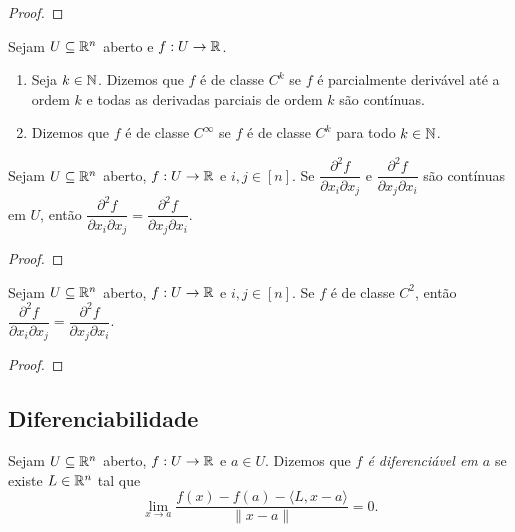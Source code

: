 \begin{proof}
    \blackproof
\end{proof}

\begin{definition}
    Sejam $U \subseteq \mathbb{R}^n$ aberto e $f : U \to \mathbb{R}$.
        \begin{enumerate}[leftmargin=*, align=left, label=\textbf{(\alph*)}]
            \item Seja $k \in \mathbb{N}$. Dizemos que $f$ é de classe $C^k$ se $f$ é parcialmente derivável até a ordem $k$ e todas as derivadas parciais de ordem $k$ são contínuas.
            \item Dizemos que $f$ é de classe $C^{\infty}$ se $f$ é de classe $C^k$ para todo $k \in \mathbb{N}$.
        \end{enumerate}
\end{definition}

\begin{theorem}
    Sejam $U \subseteq \mathbb{R}^n$ aberto, $f : U \to \mathbb{R}$ e $i,j \in [n]$. Se $\dfrac{\partial^2 f}{\partial x_i \partial x_j}$ e $\dfrac{\partial^2 f}{\partial x_j \partial x_i}$ são contínuas em $U$, então $\dfrac{\partial^2 f}{\partial x_i \partial x_j} = \dfrac{\partial^2 f}{\partial x_j \partial x_i}$.
\end{theorem}

\begin{proof}
    \blackproof
\end{proof}

\begin{corollary}
    Sejam $U \subseteq \mathbb{R}^n$ aberto, $f : U \to \mathbb{R}$ e $i,j \in [n]$. Se $f$ é de classe $C^2$, então $\dfrac{\partial^2 f}{\partial x_i \partial x_j} = \dfrac{\partial^2 f}{\partial x_j \partial x_i}$.
\end{corollary}

\begin{proof}
    \blackproof
\end{proof}

\subsection{Diferenciabilidade}

\begin{definition}
    Sejam $U \subseteq \mathbb{R}^n$ aberto, $f : U \to \mathbb{R}$ e $a \in U$. Dizemos que \emph{$f$ é diferenciável em $a$} se existe $L \in \mathbb{R}^n$ tal que
        \[
            \lim_{x \to a} \dfrac{f(x) - f(a) - \langle L, x-a \rangle}{\|x-a\|} = 0.
        \]
\end{definition}

